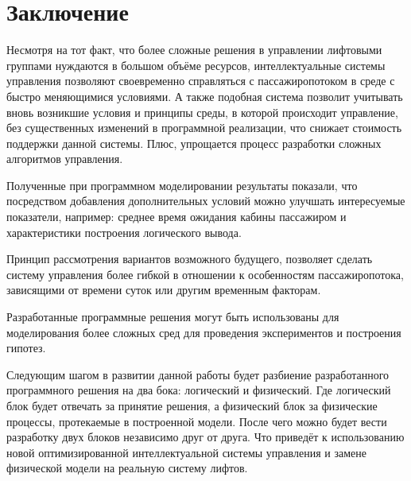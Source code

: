 \chapter*{Заключение}

	Несмотря на тот факт, что более сложные решения в управлении лифтовыми группами нуждаются в большом объёме ресурсов,
		интеллектуальные системы управления позволяют своевременно справляться с пассажиропотоком в среде с быстро
		меняющимися условиями. А также подобная система позволит учитывать вновь возникшие условия и принципы
		среды, в которой происходит управление, без существенных изменений в программной реализации, что снижает
		стоимость поддержки данной системы. Плюс, упрощается процесс разработки сложных алгоритмов управления.

	Полученные при программном моделировании результаты показали, что посредством добавления дополнительных условий
		можно улучшать интересуемые показатели, например: среднее время ожидания кабины пассажиром и
		характеристики построения логического вывода.

	Принцип рассмотрения вариантов возможного будущего, позволяет сделать систему управления более гибкой в отношении к
		особенностям пассажиропотока, зависящими от времени суток или другим временным факторам.

	Разработанные программные решения могут быть использованы для моделирования более сложных сред для проведения
		экспериментов и построения гипотез.

	Следующим шагом в развитии данной работы будет разбиение разработанного программного решения на два бока: логический и
		физический. Где логический блок будет отвечать за принятие решения, а физический блок за физические процессы,
		протекаемые в построенной модели. После чего можно будет вести разработку двух блоков независимо друг от друга.
		Что приведёт к использованию новой оптимизированной интеллектуальной системы управления и замене физической
		модели на реальную систему лифтов.
